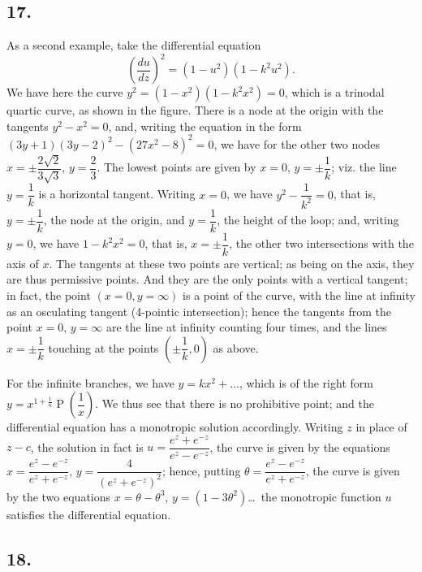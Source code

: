 \documentclass[11pt,a4paper]{article}
\theoremstyle{definition}
\DeclareMathOperator{\Pf}{P}
\begin{document}
\subsection*{17.}

As a second example, take the differential equation
\[
\left(\frac{du}{dz}\right)^2 = (1 - u^2)(1 - k^2 u^2).
\]
We have here the curve $y^2 = (1 - x^2)(1 - k^2 x^2) = 0$, which is a trinodal quartic curve, as shown in the figure. There is a node at the origin with the tangents $y^2 - x^2 = 0$, and, writing the equation in the form $(3y + 1)(3y - 2)^2 - (27x^2 - 8)^2 = 0$, we have for the other two nodes $x = \pm\dfrac{2\sqrt{2}}{3\sqrt{3}}$, $y = \dfrac{2}{3}$. The lowest points are given by $x = 0$, $y = \pm\dfrac{1}{k}$; viz. the line $y = \dfrac{1}{k}$ is a horizontal tangent. Writing $x = 0$, we have $y^2 - \dfrac{1}{k^2} = 0$, that is, $y = \pm\dfrac{1}{k}$, the node at the origin, and $y = \dfrac{1}{k}$, the height of the loop; and, writing $y = 0$, we have $1 - k^2 x^2 = 0$, that is, $x = \pm\dfrac{1}{k}$, the other two intersections with the axis of $x$. The tangents at these two points are vertical; as being on the axis, they are thus permissive points. And they are the only points with a vertical tangent; in fact, the point $(x = 0, y = \infty)$ is a point of the curve, with the line at infinity as an osculating tangent (4-pointic intersection); hence the tangents from the point $x = 0$, $y = \infty$ are the line at infinity counting four times, and the lines $x = \pm\dfrac{1}{k}$ touching at the points $\left(\pm\dfrac{1}{k}, 0\right)$ as above.

For the infinite branches, we have $y = kx^2 + \ldots$, which is of the right form $y = x^{1 + \frac{1}{n}} \Pf\left(\dfrac{1}{x}\right)$. We thus see that there is no prohibitive point; and the differential equation has a monotropic solution accordingly. Writing $z$ in place of $z - c$, the solution in fact is $u = \dfrac{e^z + e^{-z}}{e^z - e^{-z}}$, the curve is given by the equations $x = \dfrac{e^z - e^{-z}}{e^z + e^{-z}}$, $y = \dfrac{4}{(e^z + e^{-z})^2}$; hence, putting $\theta = \dfrac{e^z - e^{-z}}{e^z + e^{-z}}$, the curve is given by the two equations $x = \theta - \theta^3$, $y = (1 - 3\theta^2)$\ldots\ the monotropic function $u$ satisfies the differential equation.

\subsection*{18.}
\end{document}
